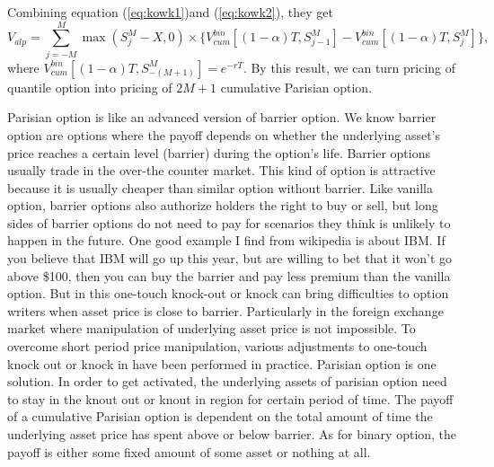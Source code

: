 \documentclass[11pt]{book}
\begin{document}
Combining equation (\ref{eq:kowk1})and (\ref{eq:kowk2}), they get
\begin{equation}\label{eq:kowk3}
V_{alp} = \sum^M_{j=-M} \max (S^M_j - X,0) \times \{V_{cum}^{bin}[(1-\alpha)T, S^M_{j-1}] - V^{bin}_{cum}[(1-\alpha)T, S^M_j]\} ,
\end{equation}
where $V^{bin}_{cum}[(1-\alpha)T, S_{-(M+1)}^M] = e^{-rT}$. By this result, we can turn pricing of quantile option into pricing of $2M+1$ cumulative Parisian option. 


Parisian option is like an advanced version of barrier option. We know barrier option are options where the payoff depends on whether the underlying asset's price reaches a certain level (barrier) during the option's life. Barrier options usually trade in the over-the counter market. This kind of option is attractive because it is usually cheaper than similar option without barrier. Like vanilla option, barrier options also authorize holders the right to buy or sell, but  long sides of barrier options do not need to pay for scenarios they think is unlikely to happen in the future. One good example I find from wikipedia is about IBM. If you believe that IBM will go up this year, but are willing to bet that it won't go above \$100, then you can buy the barrier and pay less premium than the vanilla option. But in this one-touch knock-out or knock can bring difficulties to option writers when asset price is close to barrier. Particularly in the foreign exchange market where manipulation of underlying asset price is not impossible. To overcome short period price manipulation, various adjustments to one-touch knock out or knock in have been performed in practice. Parisian option is one solution.  In order to get activated, the underlying assets of parisian option need to stay in the knout out or knout in region for certain period of time. The payoff of a cumulative Parisian option is dependent on the total amount of time the underlying asset price has spent above or below barrier. As for binary option, the payoff is either some fixed amount of some asset or nothing at all. 
\end{document}
